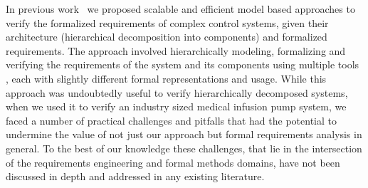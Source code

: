 In previous work~\cite{hilt2013, req2code, ICCPS2014} we proposed scalable and efficient model based approaches to verify the formalized requirements of complex control systems, given their architecture (hierarchical decomposition into components) and formalized requirements. The approach involved hierarchically modeling, formalizing and verifying the requirements of the system and its components using multiple tools%
, each with slightly different formal representations and usage. While this approach was undoubtedly useful to verify hierarchically decomposed systems, when we used it to verify an industry sized medical infusion pump system, we faced a number of practical challenges and pitfalls that had the potential to undermine the value of not just our approach but formal requirements analysis in general. To the best of our knowledge these challenges, that lie in the intersection of the requirements engineering and formal methods domains, have not been discussed in depth and addressed in any existing literature.

